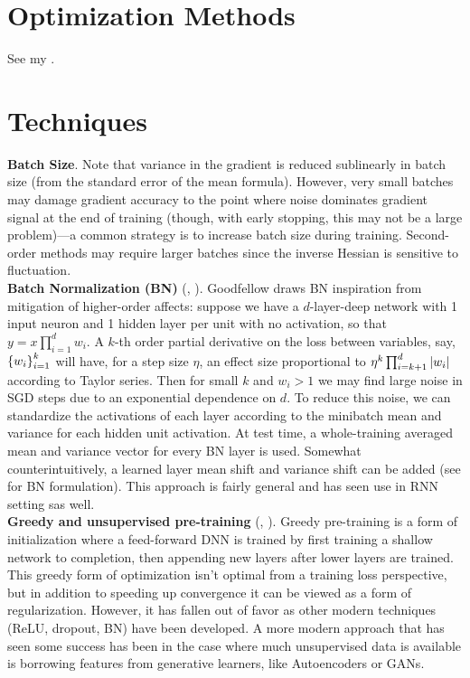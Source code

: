\documentclass{article}
\begin{document}
\section{Optimization Methods}

See my .

\section{Techniques}\label{sec:techniques}

\noindent
\textbf{Batch Size}. Note that variance in the gradient is reduced sublinearly in batch size (from the standard error of the mean formula). However, very small batches may damage gradient accuracy to the point where noise dominates gradient signal at the end of training (though, with early stopping, this may not be a large problem)---a common strategy is to increase batch size during training. Second-order methods may require larger batches since the inverse Hessian is sensitive to fluctuation.
\\
\noindent
\textbf{Batch Normalization (BN)} (, ). Goodfellow draws BN inspiration from mitigation of higher-order affects: suppose we have a $d$-layer-deep network with 1 input neuron and 1 hidden layer per unit with no activation, so that $y=x\prod_{i=1}^dw_i$. A $k$-th order partial derivative on the loss between variables, say, $\left\{{w_i}\right\}_{i=1}^k$ will have, for a step size $\eta$, an effect size proportional to $\eta^k\prod_{i=k + 1}^{d}\left|{w_i}\right|$ according to Taylor series. Then for small $k$ and $w_i>1$ we may find large noise in SGD steps due to an exponential dependence on $d$. To reduce this noise, we can standardize the activations of each layer according to the minibatch mean and variance for each hidden unit activation. At test time, a whole-training averaged mean and variance vector for every BN layer is used. Somewhat counterintuitively, a learned layer mean shift and variance shift can be added (see  for BN formulation). This approach is fairly general and has seen use in RNN setting sas well.
\\
\noindent
\textbf{Greedy and unsupervised pre-training} (, ). Greedy pre-training is a form of initialization where a feed-forward DNN is trained by first training a shallow network to completion, then appending new layers after lower layers are trained. This greedy form of optimization isn't optimal from a training loss perspective, but in addition to speeding up convergence it can be viewed as a form of regularization. However, it has fallen out of favor as other modern techniques (ReLU, dropout, BN) have been developed. A more modern approach that has seen some success has been in the case where much unsupervised data is available is borrowing features from generative learners, like Autoencoders or GANs.
\end{document}
